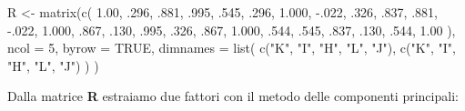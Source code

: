 \documentclass[
  11pt,
]{krantz}
\makeatletter
\newenvironment{Shaded}{\begin{snugshade}}{\end{snugshade}}
\newcommand{\AttributeTok}[1]{\textcolor[rgb]{0.61,0.61,0.61}{#1}}
\newcommand{\ConstantTok}[1]{\textcolor[rgb]{0,0,0}{#1}}
\newcommand{\DecValTok}[1]{\textcolor[rgb]{0.06,0.06,0.06}{#1}}
\newcommand{\FloatTok}[1]{\textcolor[rgb]{0.06,0.06,0.06}{#1}}
\newcommand{\FunctionTok}[1]{\textcolor[rgb]{0,0,0}{#1}}
\newcommand{\NormalTok}[1]{#1}
\newcommand{\OtherTok}[1]{\textcolor[rgb]{0.37,0.37,0.37}{#1}}
\newcommand{\SpecialCharTok}[1]{\textcolor[rgb]{0,0,0}{#1}}
\newcommand{\StringTok}[1]{\textcolor[rgb]{0.5,0.5,0.5}{#1}}
\newenvironment{kframe}{%
\medskip{}
\setlength{\fboxsep}{.8em}
 \def\at@end@of@kframe{}%
 \ifinner\ifhmode%
  \def\at@end@of@kframe{\end{minipage}}%
  \begin{minipage}{\columnwidth}%
 \fi\fi%
 \def\FrameCommand##1{\hskip\@totalleftmargin \hskip-\fboxsep
 \colorbox{shadecolor}{##1}\hskip-\fboxsep
     \hskip-\linewidth \hskip-\@totalleftmargin \hskip\columnwidth}%
 \MakeFramed {\advance\hsize-\width
   \@totalleftmargin\z@ \linewidth\hsize
   \@setminipage}}%
 {\par\unskip\endMakeFramed%
 \at@end@of@kframe}
\renewenvironment{Shaded}{\begin{kframe}}{\end{kframe}}
\theoremstyle{definition}
\theoremstyle{definition}
\theoremstyle{definition}
\theoremstyle{definition}
\theoremstyle{remark}
\makeatother
\begin{document}
\begin{Shaded}
\begin{Highlighting}[]
\NormalTok{R }\OtherTok{\textless{}{-}} \FunctionTok{matrix}\NormalTok{(}\FunctionTok{c}\NormalTok{(}
  \FloatTok{1.00}\NormalTok{, .}\DecValTok{296}\NormalTok{, .}\DecValTok{881}\NormalTok{, .}\DecValTok{995}\NormalTok{, .}\DecValTok{545}\NormalTok{,}
\NormalTok{  .}\DecValTok{296}\NormalTok{, }\FloatTok{1.000}\NormalTok{, }\SpecialCharTok{{-}}\NormalTok{.}\DecValTok{022}\NormalTok{, .}\DecValTok{326}\NormalTok{, .}\DecValTok{837}\NormalTok{,}
\NormalTok{  .}\DecValTok{881}\NormalTok{, }\SpecialCharTok{{-}}\NormalTok{.}\DecValTok{022}\NormalTok{, }\FloatTok{1.000}\NormalTok{, .}\DecValTok{867}\NormalTok{, .}\DecValTok{130}\NormalTok{,}
\NormalTok{  .}\DecValTok{995}\NormalTok{, .}\DecValTok{326}\NormalTok{, .}\DecValTok{867}\NormalTok{, }\FloatTok{1.000}\NormalTok{, .}\DecValTok{544}\NormalTok{,}
\NormalTok{  .}\DecValTok{545}\NormalTok{, .}\DecValTok{837}\NormalTok{, .}\DecValTok{130}\NormalTok{, .}\DecValTok{544}\NormalTok{, }\FloatTok{1.00}
\NormalTok{),}
\AttributeTok{ncol =} \DecValTok{5}\NormalTok{, }\AttributeTok{byrow =} \ConstantTok{TRUE}\NormalTok{, }\AttributeTok{dimnames =} \FunctionTok{list}\NormalTok{(}
  \FunctionTok{c}\NormalTok{(}\StringTok{"K"}\NormalTok{, }\StringTok{"I"}\NormalTok{, }\StringTok{"H"}\NormalTok{, }\StringTok{"L"}\NormalTok{, }\StringTok{"J"}\NormalTok{), }\FunctionTok{c}\NormalTok{(}\StringTok{"K"}\NormalTok{, }\StringTok{"I"}\NormalTok{, }\StringTok{"H"}\NormalTok{, }\StringTok{"L"}\NormalTok{, }\StringTok{"J"}\NormalTok{)}
\NormalTok{)}
\NormalTok{)}
\end{Highlighting}
\end{Shaded}

Dalla matrice \textbf{R} estraiamo due fattori con il metodo delle componenti principali:
\end{document}
